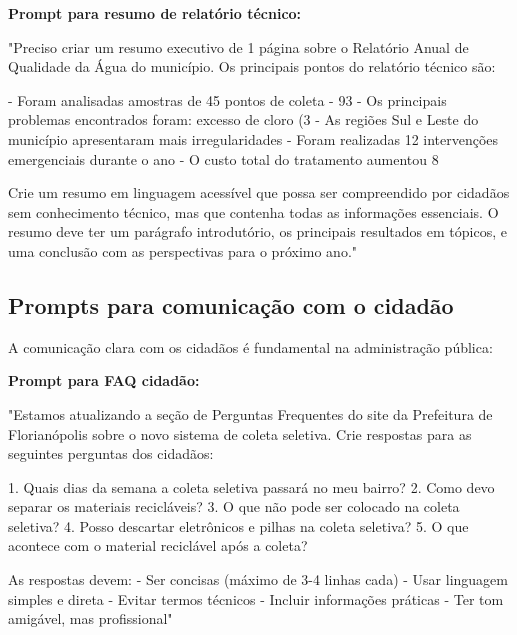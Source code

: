 \documentclass[12pt,a4paper]{book}
\begin{document}
\begin{tcolorbox}[exemplo]
\textbf{Prompt para resumo de relatório técnico:}

"Preciso criar um resumo executivo de 1 página sobre o Relatório Anual de Qualidade da Água do município. Os principais pontos do relatório técnico são:

- Foram analisadas amostras de 45 pontos de coleta
- 93%
- Os principais problemas encontrados foram: excesso de cloro (3%
- As regiões Sul e Leste do município apresentaram mais irregularidades
- Foram realizadas 12 intervenções emergenciais durante o ano
- O custo total do tratamento aumentou 8%

Crie um resumo em linguagem acessível que possa ser compreendido por cidadãos sem conhecimento técnico, mas que contenha todas as informações essenciais. O resumo deve ter um parágrafo introdutório, os principais resultados em tópicos, e uma conclusão com as perspectivas para o próximo ano."
\end{tcolorbox}

\subsection{Prompts para comunicação com o cidadão}

A comunicação clara com os cidadãos é fundamental na administração pública:

\begin{tcolorbox}[exemplo]
\textbf{Prompt para FAQ cidadão:}

"Estamos atualizando a seção de Perguntas Frequentes do site da Prefeitura de Florianópolis sobre o novo sistema de coleta seletiva. Crie respostas para as seguintes perguntas dos cidadãos:

1. Quais dias da semana a coleta seletiva passará no meu bairro?
2. Como devo separar os materiais recicláveis?
3. O que não pode ser colocado na coleta seletiva?
4. Posso descartar eletrônicos e pilhas na coleta seletiva?
5. O que acontece com o material reciclável após a coleta?

As respostas devem:
- Ser concisas (máximo de 3-4 linhas cada)
- Usar linguagem simples e direta
- Evitar termos técnicos
- Incluir informações práticas
- Ter tom amigável, mas profissional"
\end{tcolorbox}
\end{document}
